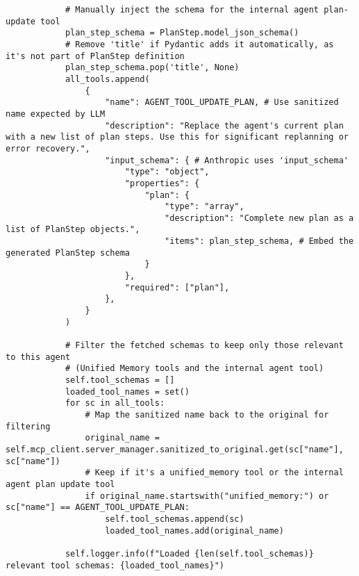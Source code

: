 \documentclass[12pt,a4paper]{article}
\begin{document}
\begin{pageablecode}
\begin{verbatim}
            # Manually inject the schema for the internal agent plan-update tool
            plan_step_schema = PlanStep.model_json_schema()
            # Remove 'title' if Pydantic adds it automatically, as it's not part of PlanStep definition
            plan_step_schema.pop('title', None)
            all_tools.append(
                {
                    "name": AGENT_TOOL_UPDATE_PLAN, # Use sanitized name expected by LLM
                    "description": "Replace the agent's current plan with a new list of plan steps. Use this for significant replanning or error recovery.",
                    "input_schema": { # Anthropic uses 'input_schema'
                        "type": "object",
                        "properties": {
                            "plan": {
                                "type": "array",
                                "description": "Complete new plan as a list of PlanStep objects.",
                                "items": plan_step_schema, # Embed the generated PlanStep schema
                            }
                        },
                        "required": ["plan"],
                    },
                }
            )

            # Filter the fetched schemas to keep only those relevant to this agent
            # (Unified Memory tools and the internal agent tool)
            self.tool_schemas = []
            loaded_tool_names = set()
            for sc in all_tools:
                # Map the sanitized name back to the original for filtering
                original_name = self.mcp_client.server_manager.sanitized_to_original.get(sc["name"], sc["name"])
                # Keep if it's a unified_memory tool or the internal agent plan update tool
                if original_name.startswith("unified_memory:") or sc["name"] == AGENT_TOOL_UPDATE_PLAN:
                    self.tool_schemas.append(sc)
                    loaded_tool_names.add(original_name)

            self.logger.info(f"Loaded {len(self.tool_schemas)} relevant tool schemas: {loaded_tool_names}")


\end{verbatim}
\end{pageablecode}
\end{document}
